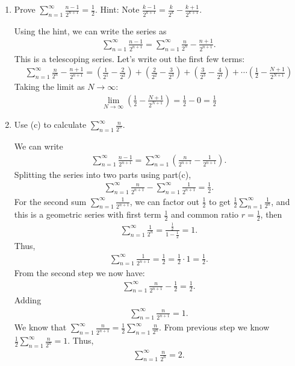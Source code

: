 \documentclass [10pt]{article}
\newcommand{\jg}[1]{{\color{blue} #1}}
\begin{document}
\begin{enumerate}
\begin{enumerate}
{}
\item Prove $\sum_{n=1}^{\infty} \frac{n-1}{2^{n+1}}=\frac{1}{2}$. Hint:
Note $\frac{k-1}{2^{k+1}}=\frac{k}{2^k}-\frac{k+1}{2^{k+1}}$.


\jg{
Using the hint, we can write the series as 
\begin{align*}
    \sum_{n=1}^{\infty} \frac{n-1}{2^{n+1}} = \sum_{n=1}^{\infty} \frac{n}{2^n} - \frac{n+1}{2^{n+1}}. 
\end{align*}
This is a telescoping series. Let's write out the first few terms: 
\begin{align*}
    \sum_{n=1}^{\infty} \frac{n}{2^n} - \frac{n+1}{2^{n+1}} = \left(\frac{1}{2^1} - \frac{2}{2^2} \right) + \left(\frac{2}{2^2} - \frac{3}{2^3} \right) + \left( \frac{3}{2^3} - \frac{4}{2^4}\right) + \cdots \left( \frac{1}{2} - \frac{N+1}{2^{N+1}} \right)
\end{align*}
Taking the limit as $N \rightarrow \infty$: 
\begin{align*}
    \lim_{N\rightarrow \infty} \left( \frac{1}{2} - \frac{N+1}{2^{N+1}} \right) = \frac{1}{2} - 0 = \frac{1}{2}
\end{align*}

}
\item Use (c) to calculate $\sum_{n=1}^{\infty} \frac{n}{2^n}$.

\jg{

We can write 
\begin{align*}
   \sum_{n=1}^{\infty}  \frac{n-1}{2^{n+1}} = \sum_{n=1}^{\infty} \left( \frac{n}{2^{n+1}} - \frac{1}{2^{n+1}}\right). 
\end{align*}
Splitting the series into two parts using part(c), 
\begin{align*}
    \sum_{n=1}^{\infty} \frac{n}{2^{n+1}} - \sum_{n=1}^{\infty}  \frac{1}{2^{n+1}} = \frac{1}{2}.
\end{align*}
For the second sum $\sum_{n=1}^{\infty}  \frac{1}{2^{n+1}}$, we can factor out $\frac{1}{2}$ to get $\frac{1}{2} \sum_{n=1}^{\infty} \frac{1}{2^n}$, and this is a geometric series with first term $\frac{1}{2}$ and common ratio $r=\frac{1}{2}$, then
\begin{align*}
    \sum_{n=1}^{\infty} \frac{1}{2^n} = \frac{\frac{1}{2}}{1 - \frac{1}{2}} = 1. 
\end{align*}
Thus, 
\begin{align*}
    \sum_{n=1}^{\infty}  \frac{1}{2^{n+1}} = \frac{1}{2} = \frac{1}{2} \cdot 1 = \frac{1}{2}. 
\end{align*}
From the second step we now have: 
\begin{align*}
    \sum_{n=1}^{\infty} \frac{n}{2^{n+1}} - \frac{1}{2} = \frac{1}{2}.
\end{align*}
Adding 
\begin{align*}
    \sum_{n=1}^{\infty} \frac{n}{2^{n+1}}  = 1.
\end{align*}
We know that $\sum_{n=1}^{\infty} \frac{n}{2^{n+1}} = \frac{1}{2} \sum_{n=1}^{\infty} \frac{n}{2^n}$. From previous step we know $\frac{1}{2} \sum_{n=1}^{\infty} \frac{n}{2^n} = 1$. Thus, 
\begin{align*}
    \sum_{n=1}^{\infty} \frac{n}{2^n} = 2. 
\end{align*}

}
\end{enumerate}
\end{enumerate}
\end{document}
